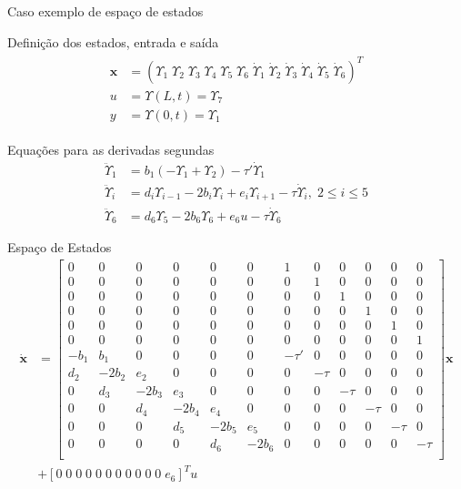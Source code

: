 \documentclass[10pt]{beamer}
\newcommand\Fontvi{\fontsize{6}{7.2}\selectfont}
\begin{document}
\begin{frame}[fragile]{Caso exemplo de espaço de estados}
\begin{block}{Definição dos estados, entrada e saída}
	\begin{align}
	\begin{array}{ll}
	\mathbf{x} &= \left(\Upsilon_1\;\Upsilon_2\;\Upsilon_3\;\Upsilon_4\;\Upsilon_5\;\Upsilon_6\;\dot{\Upsilon}_1\;\dot{\Upsilon}_2\;\dot{\Upsilon}_3\;\dot{\Upsilon}_4\;\dot{\Upsilon}_5\;\dot{\Upsilon}_6\right)^T\\
	u &= \Upsilon(L,t) = \Upsilon_7\\
	y &= \Upsilon(0,t) = \Upsilon_1
\end{array}
 \end{align} 
\end{block}

\begin{block}{Equações para as derivadas segundas}
\begin{align}
	\ddot{\Upsilon}_1 &= b_1\left(-\Upsilon_1 + \Upsilon_2\right) - \tau'\dot{\Upsilon}_1\\
	\ddot{\Upsilon}_i &=d_i\Upsilon_{i-1} - 2b_i \Upsilon_{i} + e_i\Upsilon_{i+1} - \tau \dot{\Upsilon}_i,\; 2\le i \le 5\\
	\ddot{\Upsilon}_6 &= d_6\Upsilon_5 - 2b_6 \Upsilon_6 + e_6 u - \tau \dot{\Upsilon}_6
\end{align}	
\end{block}
\end{frame}

\begin{frame}[fragile]{Espaço de Estados}
\Fontvi
	\begin{align}
 	\dot{\mathbf{x}} &= \left[\begin{array}{cccccccccccc}
 		0 & 0 & 0 & 0 & 0 & 0 & 1 & 0 & 0 & 0 & 0 & 0\\
 		0 & 0 & 0 & 0 & 0 & 0 & 0 & 1 & 0 & 0 & 0 & 0\\
 		0 & 0 & 0 & 0 & 0 & 0 & 0 & 0 & 1 & 0 & 0 & 0\\
 		0 & 0 & 0 & 0 & 0 & 0 & 0 & 0 & 0 & 1 & 0 & 0\\
 		0 & 0 & 0 & 0 & 0 & 0 & 0 & 0 & 0 & 0 & 1 & 0\\
 		0 & 0 & 0 & 0 & 0 & 0 & 0 & 0 & 0 & 0 & 0 & 1\\
 		-b_1 & b_1 & 0 & 0 & 0 & 0 & -\tau' & 0     & 0 & 0 & 0 & 0\\
 		d_2 & -2b_2  & e_2  & 0  & 0 & 0 &  0    & -\tau & 0 & 0 & 0 & 0\\
 		0 & d_3 & -2b_3  & e_3  & 0  & 0 & 0 &  0    & -\tau & 0 & 0 & 0\\
 		0 & 0 & d_4 & -2b_4  & e_4  & 0  & 0 & 0 &  0    & -\tau & 0 & 0\\
 		0 & 0 & 0 & d_5 & -2b_5  & e_5  & 0  & 0 & 0 &  0    & -\tau & 0\\
 		0 & 0 & 0 & 0 & d_6 & -2b_6  & 0  & 0 & 0 &  0    & 0   &-\tau\\
 	\end{array}\right]\mathbf{x} \nonumber\\
 	&+ \left[0\;0\;0\;0\;0\;0\;0\;0\;0\;0\;0\;e_6\right]^Tu
 \end{align}
\end{frame}  
\end{document}
